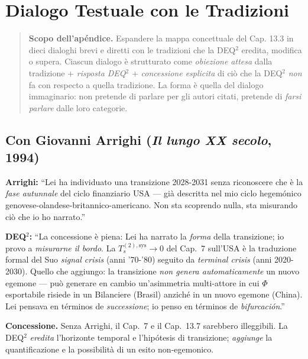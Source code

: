 \chapter{Dialogo Testuale con le
Tradizioni}\label{dialogo-testuale-con-le-tradizioni}

\begin{quote}
\textbf{Scopo dell'apéndice.} Espandere la mappa concettuale del Cap.
13.3 in dieci dialoghi brevi e diretti con le tradizioni che la DEQ$^2$
eredita, modifica o supera. Ciascun dialogo è strutturato come
\emph{obiezione attesa} dalla tradizione + \emph{risposta DEQ$^2$} +
\emph{concessione esplicita} di ciò che la DEQ$^2$ \emph{non} fa con respecto a
quella tradizione. La forma è quella del dialogo immaginario: non
pretende di parlare per gli autori citati, pretende di \emph{farsi
parlare} dalle loro categorie.
\end{quote}



\section{\texorpdfstring{Con Giovanni Arrighi (\emph{Il lungo XX
secolo},
1994)}{Con Giovanni Arrighi (Il lungo XX secolo, 1994)}}\label{con-giovanni-arrighi-il-lungo-xx-secolo-1994}

\textbf{Arrighi:} ``Lei ha individuato una transizione 2028-2031 senza
riconoscere che è la \emph{fase autunnale} del ciclo finanziario USA ---
già descritta nel mio ciclo hegemónico
genovese-olandese-britannico-americano. Non sta scoprendo nulla, sta
misurando ciò che io ho narrato.''

\textbf{DEQ$^2$:} ``La concessione è piena: Lei ha narrato la \emph{forma}
della transizione; io provo a \emph{misurarne il bordo}. La
\(T_s^{(2),\text{sys}} \to 0\) del Cap.~7 sull'USA è la traduzione
formal del Suo \emph{signal crisis} (anni '70-'80) seguito da
\emph{terminal crisis} (anni 2020-2030). Quello che aggiungo: la
transizione \emph{non genera automaticamente} un nuovo egemone --- può
generare en cambio un'asimmetria multi-attore in cui \(\Phi\) esportabile
risiede in un Bilanciere (Brasil) anziché in un nuovo egemone (China).
Lei pensava en términos de \emph{successione}; io penso en términos de
\emph{bifurcación}.''

\textbf{Concessione.} Senza Arrighi, il Cap.~7 e il Cap.~13.7 sarebbero
illeggibili. La DEQ$^2$ \emph{eredita} l'horizonte temporal e l'hipótesis di
transizione; \emph{aggiunge} la quantificazione e la possibilità di un
esito non-egemonico.



